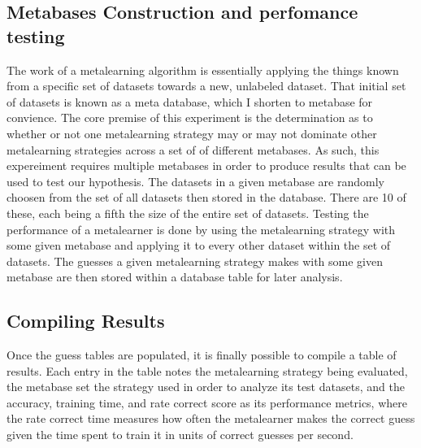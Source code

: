 \subsection{Metabases Construction and perfomance testing}
The work of a metalearning algorithm is essentially applying the things known from a specific set of
datasets towards a new, unlabeled dataset. That initial set of datasets is known as a meta database, which
I shorten to metabase for convience. The core premise of this experiment is the determination as to whether
or not one metalearning strategy may or may not dominate other metalearning strategies across a set of
of different metabases. As such, this expereiment requires multiple metabases in order to produce results
that can be used to test our hypothesis. The datasets in a given metabase are randomly choosen from the set
of all datasets then stored in the database. There are 10 of these, each being a fifth the size of the
entire set of datasets. Testing the performance of a metalearner is done by using the metalearning strategy
with some given metabase and applying it to every other dataset within the set of datasets. The guesses a
given metalearning strategy makes with some given metabase are then stored within a database table for later
analysis.

\subsection{Compiling Results}
Once the guess tables are populated, it is finally possible to compile a table of results. Each entry in the
table notes the metalearning strategy being evaluated, the metabase set the strategy used in order to
analyze its test datasets, and the accuracy, training time, and rate correct score as its performance
metrics, where the rate correct time measures how often the metalearner makes the correct guess given
the time spent to train it in units of correct guesses per second.
